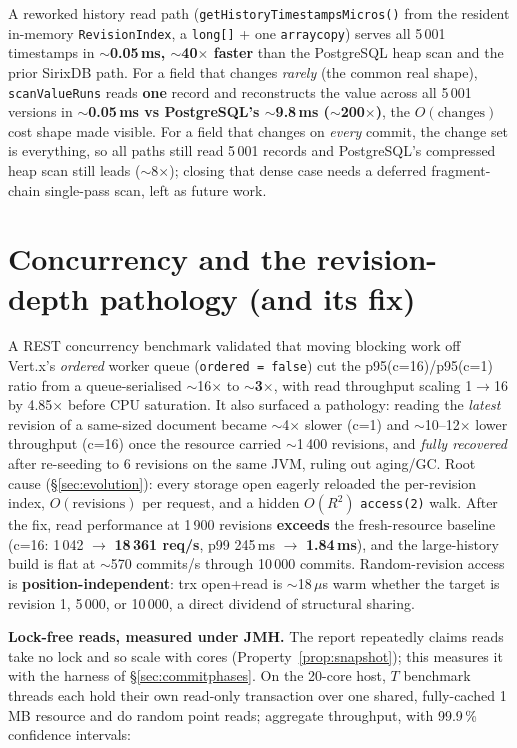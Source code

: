 \documentclass[11pt,a4paper,oneside]{report}
\theoremstyle{sirixthm}
\newcommand{\code}[1]{\texttt{#1}}
\begin{document}
A reworked history read path (\code{getHistoryTimestampsMicros()} from the resident in-memory
\code{RevisionIndex}, a \code{long[]} {+} one \code{arraycopy}) serves all 5\,001 timestamps in
\textbf{$\sim$0.05\,ms, $\sim$40$\times$ faster} than the PostgreSQL heap scan and the prior
SirixDB path. For a field that changes \emph{rarely} (the common real shape),
\code{scanValueRuns} reads \textbf{one} record and reconstructs the value across all 5\,001
versions in \textbf{$\sim$0.05\,ms vs PostgreSQL's $\sim$9.8\,ms ($\sim$200$\times$)}, the
$O(\text{changes})$ cost shape made visible. For a field that changes on \emph{every} commit,
the change set is everything, so all paths still read 5\,001 records and PostgreSQL's
compressed heap scan still leads ($\sim$8$\times$); closing that dense case needs a deferred
fragment-chain single-pass scan, left as future work.

\section{Concurrency and the revision-depth pathology (and its fix)}
\label{sec:concurrency}

A REST concurrency benchmark validated that moving blocking work off Vert.x's \emph{ordered}
worker queue (\code{ordered = false}) cut the p95(c{=}16)/p95(c{=}1) ratio from a
queue-serialised $\sim$16$\times$ to \textbf{$\sim$3$\times$}, with read throughput scaling
1$\rightarrow$16 by 4.85$\times$ before CPU saturation. It also surfaced a pathology: reading
the \emph{latest} revision of a same-sized document became $\sim$4$\times$ slower (c{=}1) and
$\sim$10--12$\times$ lower throughput (c{=}16) once the resource carried $\sim$1\,400 revisions,
and \emph{fully recovered} after re-seeding to 6 revisions on the same JVM, ruling out
aging/GC. Root cause (\S\ref{sec:evolution}): every storage open eagerly reloaded the
per-revision index, $O(\text{revisions})$ per request, and a hidden $O(R^2)$ \code{access(2)}
walk. After the fix, read performance at 1\,900 revisions \textbf{exceeds} the fresh-resource
baseline (c{=}16: 1\,042 $\rightarrow$ \textbf{18\,361 req/s}, p99 245\,ms $\rightarrow$
\textbf{1.84\,ms}), and the large-history build is flat at $\sim$570 commits/s through 10\,000
commits. Random-revision access is \textbf{position-independent}: trx open{+}read is
$\sim$18\,$\mu$s warm whether the target is revision 1, 5\,000, or 10\,000, a direct
dividend of structural sharing.

\textbf{Lock-free reads, measured under JMH.}\label{par:lockfreeread} The report repeatedly claims reads
take no lock and so scale with cores (Property~\ref{prop:snapshot}); this measures it with the harness of
\S\ref{sec:commitphases}. On the 20-core host, $T$ benchmark threads each hold their own read-only
transaction over one shared, fully-cached 1\,MB resource and do random point reads; aggregate throughput,
with 99.9\,\% confidence intervals:
\end{document}
